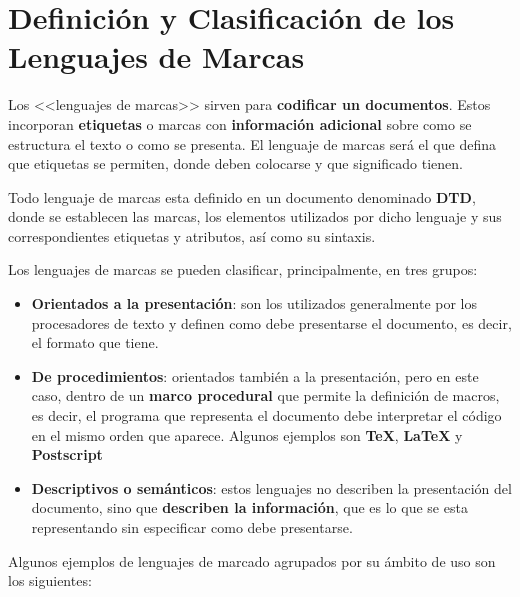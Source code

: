 \section{Definición y Clasificación de los Lenguajes de Marcas}
Los <<lenguajes de marcas>> sirven para \textbf{codificar un documentos}. Estos incorporan \textbf{etiquetas} o marcas con \textbf{información adicional} sobre como se estructura el texto o como se presenta. El lenguaje de marcas será el que defina que etiquetas se permiten, donde deben colocarse y que significado tienen.

Todo lenguaje de marcas esta definido en un documento denominado \textbf{\gls{DTD}}, donde se establecen las marcas, los elementos utilizados por dicho lenguaje y sus correspondientes etiquetas y atributos, así como su sintaxis.

Los lenguajes de marcas se pueden clasificar, principalmente, en tres grupos:

\begin{itemize}
    \item \textbf{Orientados a la presentación}: son los utilizados generalmente por los procesadores de texto y definen como debe presentarse el documento, es decir, el formato que tiene.
    \item \textbf{De procedimientos}: orientados también a la presentación, pero en este caso, dentro de un \textbf{marco procedural} que permite la definición de macros, es decir, el programa que representa el documento debe interpretar el código en el mismo orden que aparece. Algunos ejemplos son \textbf{TeX}, \textbf{LaTeX} y \textbf{Postscript}
    \item \textbf{Descriptivos o semánticos}: estos lenguajes no describen la presentación del documento, sino que \textbf{describen la información}, que es lo que se esta representando sin especificar como debe presentarse.
\end{itemize}

Algunos ejemplos de lenguajes de marcado agrupados por su ámbito de uso son los siguientes:

